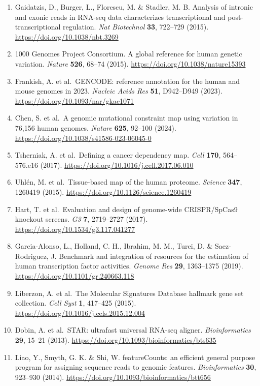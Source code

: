 \begin{enumerate}
\item
  Gaidatzis, D., Burger, L., Florescu, M. \& Stadler, M. B. Analysis of intronic and exonic reads in RNA-seq data characterizes transcriptional and post-transcriptional regulation. \emph{Nat Biotechnol} \textbf{33}, 722--729 (2015). \url{https://doi.org/10.1038/nbt.3269}
\item
  1000 Genomes Project Consortium. A global reference for human genetic variation. \emph{Nature} \textbf{526}, 68--74 (2015). \url{https://doi.org/10.1038/nature15393}
\item
  Frankish, A. et al.~GENCODE: reference annotation for the human and mouse genomes in 2023. \emph{Nucleic Acids Res} \textbf{51}, D942--D949 (2023). \url{https://doi.org/10.1093/nar/gkac1071}
\item
  Chen, S. et al.~A genomic mutational constraint map using variation in 76,156 human genomes. \emph{Nature} \textbf{625}, 92--100 (2024). \url{https://doi.org/10.1038/s41586-023-06045-0}
\item
  Tsherniak, A. et al.~Defining a cancer dependency map. \emph{Cell} \textbf{170}, 564--576.e16 (2017). \url{https://doi.org/10.1016/j.cell.2017.06.010}
\item
  Uhlén, M. et al.~Tissue-based map of the human proteome. \emph{Science} \textbf{347}, 1260419 (2015). \url{https://doi.org/10.1126/science.1260419}
\item
  Hart, T. et al.~Evaluation and design of genome-wide CRISPR/SpCas9 knockout screens. \emph{G3} \textbf{7}, 2719--2727 (2017). \url{https://doi.org/10.1534/g3.117.041277}
\item
  Garcia-Alonso, L., Holland, C. H., Ibrahim, M. M., Turei, D. \& Saez-Rodriguez, J. Benchmark and integration of resources for the estimation of human transcription factor activities. \emph{Genome Res} \textbf{29}, 1363--1375 (2019). \url{https://doi.org/10.1101/gr.240663.118}
\item
  Liberzon, A. et al.~The Molecular Signatures Database hallmark gene set collection. \emph{Cell Syst} \textbf{1}, 417--425 (2015). \url{https://doi.org/10.1016/j.cels.2015.12.004}
\item
  Dobin, A. et al.~STAR: ultrafast universal RNA-seq aligner. \emph{Bioinformatics} \textbf{29}, 15--21 (2013). \url{https://doi.org/10.1093/bioinformatics/bts635}
\item
  Liao, Y., Smyth, G. K. \& Shi, W. featureCounts: an efficient general purpose program for assigning sequence reads to genomic features. \emph{Bioinformatics} \textbf{30}, 923--930 (2014). \url{https://doi.org/10.1093/bioinformatics/btt656}

\end{enumerate}

